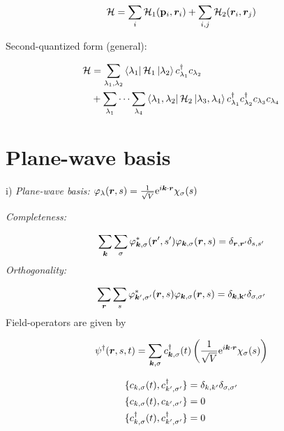 \begin{equation}
	\mathcal{H}= \sum_i \mathcal{H}_1(\vb{p}_i, \bm{r}_i) + \sum_{i,j} \mathcal{H}_2 (\bm{r}_i, \bm{r}_j )
\end{equation}

\begin{tcolorbox}
	\noindent Second-quantized form (general):
	
	\begin{align}
		\mathcal{H} & = \sum_{\lambda_{1}, \lambda_{2}} \bra{\lambda_{1}} \mathcal{H}_1 \ket{\lambda_{2}} c^{\dagger}_{\lambda_1} c_{\lambda_2} \nonumber \\
		&+ \sum_{\lambda_{1}} \cdots \sum_{\lambda_{4}} \bra{\lambda_{1}, \lambda_{2}} \mathcal{H}_2 \ket{\lambda_{3}, \lambda_{4}} c^{\dagger}_{\lambda_1} c^{\dagger}_{\lambda_2} c_{\lambda_{3}} c_{\lambda_{4}}
	\end{align}
\end{tcolorbox}

\section{Plane-wave basis}

\noindent i) \emph{Plane-wave basis:}  ${\varphi_{\lambda} (\bm{r},s) = \frac{1}{\sqrt{V}} \mathrm{e}^{i \bm{k}\cdot \bm{r}} \chi_\sigma (s)  }$ \\
\linebreak

\noindent \emph{Completeness:}

\begin{equation}
	\sum_{\bm{k}} \sum_{\sigma} \varphi_{\bm{k}, \sigma}^* (\bm{r}', s') \varphi_{\bm{k}, \sigma} (\bm{r}, s) = \delta_{\bm{r}, \bm{r}'} \delta_{s,s'}
\end{equation}
\linebreak
\noindent \emph{Orthogonality:}

\begin{equation}
	\sum_{\bm{r}} \sum_{s} \varphi_{\bm{k}', \sigma'}^* (\bm{r}, s) \varphi_{\bm{k}, \sigma} (\bm{r}, s) = \delta_{\bm{k}, \vb{k}'} \delta_{\sigma,\sigma'}
\end{equation}
\linebreak
\noindent Field-operators are given by

\begin{equation}
	\psi^\dagger (\bm{r},s,t) = \sum_{\bm{k}, \sigma} c^{\dagger}_{\bm{k}, \sigma} (t) \left( \frac{1}{\sqrt{V}} \mathrm{e}^{i \bm{k} \cdot \bm{r}} \chi_\sigma (s) \right)
\end{equation}

\begin{align}
	&\{c_{k,\sigma}(t), c^{\dagger}_{ k', \sigma'} \}= \delta_{k,k'}\delta_{\sigma,\sigma'}\\
	&\{c_{k,\sigma}(t), c_{ k', \sigma'} \}= 0\\
	&\{c^{\dagger}_{k,\sigma}(t), c^{\dagger}_{ k', \sigma'} \}= 0
\end{align}

